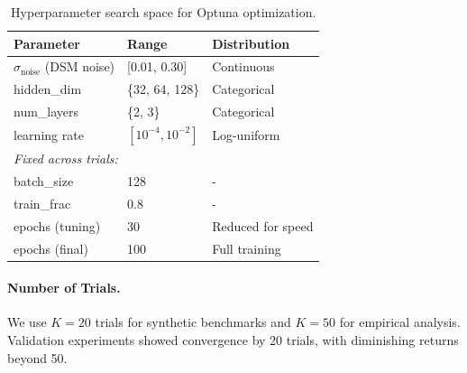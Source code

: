 \documentclass{article}
\theoremstyle{plain}
\theoremstyle{definition}
\theoremstyle{remark}
\newcommand{\1}{\mathbf{1}}
\newcommand{\z}{\bm{z}}
\begin{document}
\begin{table}[h!]
\centering
\caption{Hyperparameter search space for Optuna optimization.}
\label{tab:hp_search_space}
\begin{tabular}{lll}
\toprule
\textbf{Parameter} & \textbf{Range} & \textbf{Distribution} \\
\midrule
$\sigma_{\mathrm{noise}}$ (DSM noise) & [0.01, 0.30] & Continuous \\
hidden\_dim & \{32, 64, 128\} & Categorical \\
num\_layers & \{2, 3\} & Categorical \\
learning rate & $[10^{-4}, 10^{-2}]$ & Log-uniform \\
\midrule
\multicolumn{3}{l}{\textit{Fixed across trials:}} \\
batch\_size & 128 & - \\
train\_frac & 0.8 & - \\
epochs (tuning) & 30 & Reduced for speed \\
epochs (final) & 100 & Full training \\
\bottomrule
\end{tabular}
\end{table}

\paragraph{Number of Trials.}
We use $K = 20$ trials for synthetic benchmarks and $K = 50$ for empirical analysis. Validation experiments showed convergence by 20 trials, with diminishing returns beyond 50.

\end{document}
